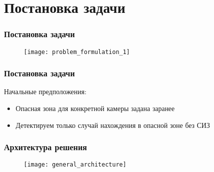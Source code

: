 \section{Постановка задачи}

\begin{frame}
    \frametitle{Постановка задачи}
    \begin{figure}
        \centering
        \texttt{[image: problem\_formulation\_1]}
    \end{figure}
\end{frame}

\begin{frame}
    \frametitle{Постановка задачи}
    Начальные предположения:
    \begin{itemize}
        \item Опасная зона для конкретной камеры задана заранее
        \item Детектируем только случай нахождения в опасной зоне без СИЗ
    \end{itemize}
\end{frame}

\begin{frame}
    \frametitle{Архитектура решения}
    \begin{figure}
        \centering
        \texttt{[image: general\_architecture]}
    \end{figure}
\end{frame}
